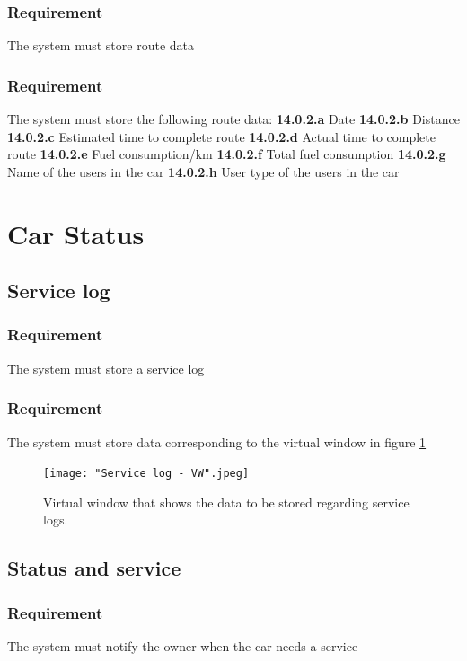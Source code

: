 \documentclass{article}
\begin{document}
{    \subsubsection{Requirement}
\hfill \break 
\- \- \-The system must store route data
    \subsubsection{Requirement}
\hfill \break 
\- \- \-The system must store the following route data:
\hfill \break 
\indent
\textbf{14.0.2.a} Date
\hfill \break 
\indent
\textbf{14.0.2.b} Distance
\hfill \break 
\indent
\textbf{14.0.2.c} Estimated time to complete route
\hfill \break 
\indent
\textbf{14.0.2.d} Actual time to complete route
\hfill \break 
\indent
\textbf{14.0.2.e} Fuel consumption/km
\hfill \break 
\indent
\textbf{14.0.2.f} Total fuel consumption
\hfill \break 
\indent
\textbf{14.0.2.g} Name of the users in the car
\hfill \break 
\indent
\textbf{14.0.2.h} User type of the users in the car

\section{Car Status}
  \subsection{Service log}
      \subsubsection{Requirement}
\hfill \break 
\- \- \-The system must store a service log
      \subsubsection{Requirement}
\hfill \break 
\- \- \- The system must store data corresponding to the virtual window in figure \ref{fig:Virtual window Service log}


\begin{figure}[htb]    
 \centering
  \texttt{[image: "Service log - VW".jpeg]}
  \caption{Virtual window that shows the data to be stored regarding service logs.}
  \label{fig:Virtual window Service log}
\end{figure}
  \subsection{Status and service}
      \subsubsection{Requirement}
\hfill \break 
\- \- \-The system must notify the owner when the car needs a service
}
\end{document}
